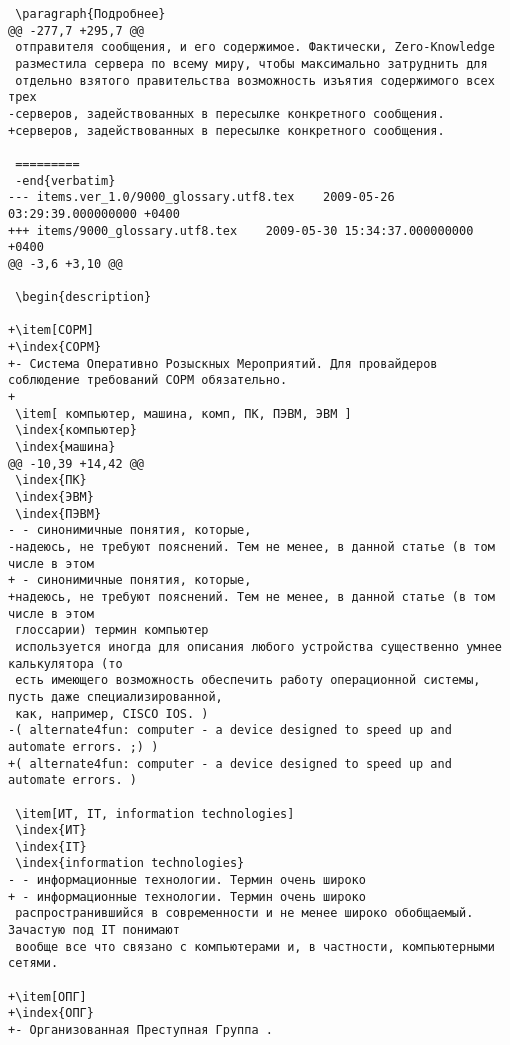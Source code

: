 \begin{verbatim}
 \paragraph{Подробнее}
@@ -277,7 +295,7 @@
 отправителя сообщения, и его содержимое. Фактически, Zero-Knowledge
 разместила сервера по всему миру, чтобы максимально затруднить для
 отдельно взятого правительства возможность изъятия содержимого всех трех
-серверов, задействованных в пересылке конкретного сообщения.
+серверов, задействованных в пересылке конкретного сообщения.

 =========
 -end{verbatim}
--- items.ver_1.0/9000_glossary.utf8.tex	2009-05-26 03:29:39.000000000 +0400
+++ items/9000_glossary.utf8.tex	2009-05-30 15:34:37.000000000 +0400
@@ -3,6 +3,10 @@

 \begin{description}

+\item[СОРМ]
+\index{СОРМ}
+- Система Оперативно Розыскных Мероприятий. Для провайдеров соблюдение требований СОРМ обязательно.
+
 \item[ компьютер, машина, комп, ПК, ПЭВМ, ЭВМ ]
 \index{компьютер}
 \index{машина}
@@ -10,39 +14,42 @@
 \index{ПК}
 \index{ЭВМ}
 \index{ПЭВМ}
- - синонимичные понятия, которые,
-надеюсь, не требуют пояснений. Тем не менее, в данной статье (в том числе в этом
+ - синонимичные понятия, которые,
+надеюсь, не требуют пояснений. Тем не менее, в данной статье (в том числе в этом
 глоссарии) термин компьютер
 используется иногда для описания любого устройства существенно умнее калькулятора (то
 есть имеющего возможность обеспечить работу операционной системы, пусть даже специализированной,
 как, например, CISCO IOS. )
-( alternate4fun: computer - a device designed to speed up and automate errors. ;) )
+( alternate4fun: computer - a device designed to speed up and automate errors. )

 \item[ИТ, IT, information technologies]
 \index{ИТ}
 \index{IT}
 \index{information technologies}
- - информационные технологии. Термин очень широко
+ - информационные технологии. Термин очень широко
 распространившийся в современности и не менее широко обобщаемый. Зачастую под IT понимают
 вообще все что связано с компьютерами и, в частности, компьютерными сетями.

+\item[ОПГ]
+\index{ОПГ}
+- Организованная Преступная Группа .


\end{verbatim}
